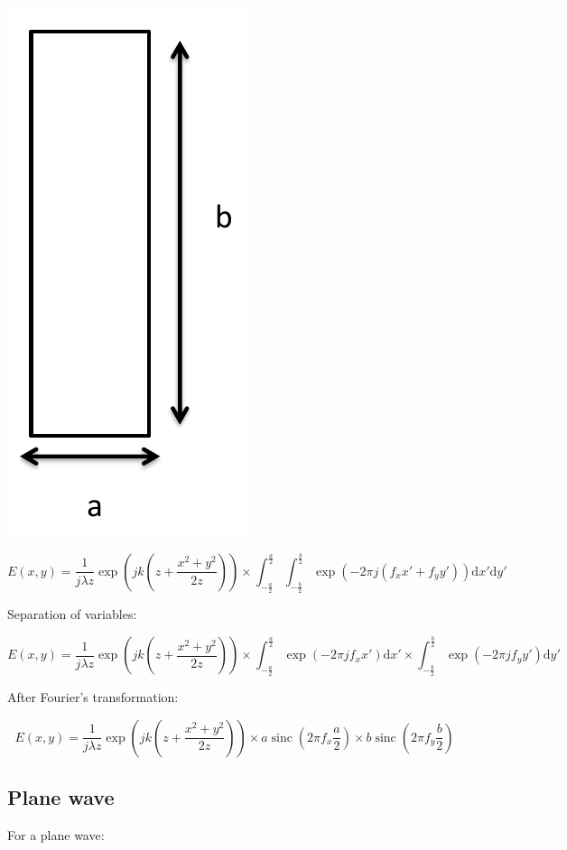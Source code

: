 \documentclass[10pt,a4paper]{article}
\DeclareMathOperator{\sinc}{sinc}
\begin{document}
\begin{center}
\includegraphics[scale=0.3]{../Ressources/schema-4-1.png}
\end{center}

\[
E(x,y)=\frac{1}{j\lambda z} \exp\left(jk\left(z+\frac{x^2+y^2}{2z}\right)\right)
\times \int_{-\frac{a}{2}}^\frac{a}{2} \int_{-\frac{b}{2}}^\frac{b}{2}
 \exp\left(-2\pi j(f_xx'+f_yy')\right)\mathrm{d}x'\mathrm{d}y'
\]

Separation of variables:

\[
E(x,y)=\frac{1}{j\lambda z} \exp\left(jk\left(z+\frac{x^2+y^2}{2z}\right)\right)
\times \int_{-\frac{a}{2}}^\frac{a}{2} \exp\left(-2\pi jf_xx'\right)\mathrm{d}x'
\times \int_{-\frac{b}{2}}^\frac{b}{2} \exp\left(-2\pi jf_yy'\right)\mathrm{d}y'
\]

After Fourier’s transformation:

\[
E(x,y)=\frac{1}{j\lambda z} \exp\left(jk\left(z+\frac{x^2+y^2}{2z}\right)\right)
\times a\sinc\left(2\pi f_x \frac{a}{2}\right)
\times b\sinc\left(2\pi f_y \frac{b}{2}\right)
\]

	\subsection{Plane wave}
For a plane wave:
\end{document}
